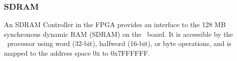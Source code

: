 \subsubsection{SDRAM}
An SDRAM Controller in the FPGA provides an interface to the 128 MB synchronous dynamic RAM (SDRAM) 
on the \DEBoard~board. It is accessible by the \processor~processor using word (32-bit), 
halfword (16-bit), or byte operations, and is mapped to the address space 
{\sf 0x} to {\sf 0x\baseAddressOffset 7FFFFFF}.


